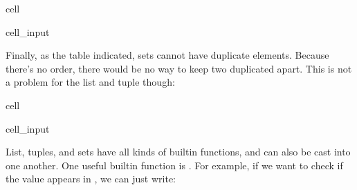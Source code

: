 \documentclass[letterpaper,10pt,english]{jupyterBook}
\begin{document}
\begin{sphinxuseclass}{cell}\begin{sphinxVerbatimInput}

\begin{sphinxuseclass}{cell_input}
\begin{sphinxVerbatim}[commandchars=\\\{\}]
\PYG{p}{[}\PYG{p}{]}
\PYG{p}{[}\PYG{p}{]}
\PYG{p}{[}\PYG{p}{]}
\end{sphinxVerbatim}

\end{sphinxuseclass}\end{sphinxVerbatimInput}

\end{sphinxuseclass}
\sphinxAtStartPar
Finally, as the table indicated, sets cannot have duplicate elements. Because there’s no order, there would be no way to keep two duplicated apart. This is not a problem for the list and tuple though:

\begin{sphinxuseclass}{cell}\begin{sphinxVerbatimInput}

\begin{sphinxuseclass}{cell_input}
\begin{sphinxVerbatim}[commandchars=\\\{\}]
  \PYG{p}{[}     \PYG{p}{]}
      
       

\end{sphinxVerbatim}

\end{sphinxuseclass}\end{sphinxVerbatimInput}

\end{sphinxuseclass}
\sphinxAtStartPar
List, tuples, and sets have all kinds of built\sphinxhyphen{}in functions, and can also be cast into one another. One useful built\sphinxhyphen{}in function is . For example, if we want to check if the value  appears in , we can just write:
\end{document}
